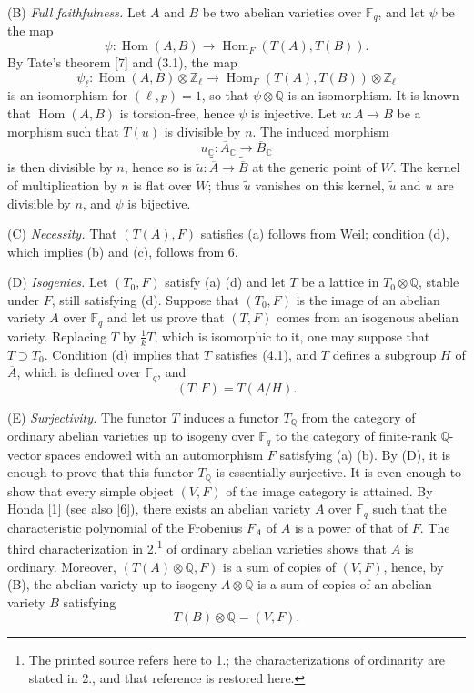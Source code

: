 \documentclass[10pt]{article}
\newcommand{\C}{\mathbb C}
\newcommand{\Fq}{\mathbb F_q}
\newcommand{\Q}{\mathbb Q}
\newcommand{\Z}{\mathbb Z}
\newcommand{\Hom}{\operatorname{Hom}}
\begin{document}
(B) \emph{Full faithfulness.} Let $A$ and $B$ be two abelian varieties over $\Fq$, and let $\psi$ be the map
\[
\psi:\Hom(A,B)\longrightarrow\Hom_F(T(A),T(B)).
\]
By Tate's theorem [7] and (3.1), the map
\[
\psi_\ell:\Hom(A,B)\otimes\Z_\ell
\longrightarrow
\Hom_F(T(A),T(B))\otimes\Z_\ell
\]
is an isomorphism for $(\ell,p)=1$, so that $\psi\otimes\Q$ is an isomorphism. It is known that $\Hom(A,B)$ is torsion-free, hence $\psi$ is injective. Let $u:A\to B$ be a morphism such that $T(u)$ is divisible by $n$. The induced morphism
\[
u_{\C}:\overline A_{\C}\longrightarrow\overline B_{\C}
\]
is then divisible by $n$, hence so is $\widetilde u:\widetilde{\overline A}\to\widetilde{\overline B}$ at the generic point of $W$. The kernel of multiplication by $n$ is flat over $W$; thus $\widetilde u$ vanishes on this kernel, $\widetilde u$ and $u$ are divisible by $n$, and $\psi$ is bijective.

(C) \emph{Necessity.} That $(T(A),F)$ satisfies (a) follows from Weil; condition (d), which implies (b) and (c), follows from 6.

(D) \emph{Isogenies.} Let $(T_0,F)$ satisfy (a) (d) and let $T$ be a lattice in $T_0\otimes\Q$, stable under $F$, still satisfying (d). Suppose that $(T_0,F)$ is the image of an abelian variety $A$ over $\Fq$ and let us prove that $(T,F)$ comes from an isogenous abelian variety. Replacing $T$ by $\frac1kT$, which is isomorphic to it, one may suppose that $T\supset T_0$. Condition (d) implies that $T$ satisfies (4.1), and $T$ defines a subgroup $H$ of $\overline A$, which is defined over $\Fq$, and
\[
(T,F)=T(A/H).
\]

(E) \emph{Surjectivity.} The functor $T$ induces a functor $T_\Q$ from the category of ordinary abelian varieties up to isogeny over $\Fq$ to the category of finite-rank $\Q$-vector spaces endowed with an automorphism $F$ satisfying (a) (b). By (D), it is enough to prove that this functor $T_\Q$ is essentially surjective. It is even enough to show that every simple object $(V,F)$ of the image category is attained. By Honda [1] (see also [6]), there exists an abelian variety $A$ over $\Fq$ such that the characteristic polynomial of the Frobenius $F_A$ of $A$ is a power of that of $F$. The third characterization in 2.\footnote{The printed source refers here to 1.; the characterizations of ordinarity are stated in 2., and that reference is restored here.} of ordinary abelian varieties shows that $A$ is ordinary. Moreover, $(T(A)\otimes\Q,F)$ is a sum of copies of $(V,F)$, hence, by (B), the abelian variety up to isogeny $A\otimes\Q$ is a sum of copies of an abelian variety $B$ satisfying
\[
T(B)\otimes\Q=(V,F).
\]
\end{document}
